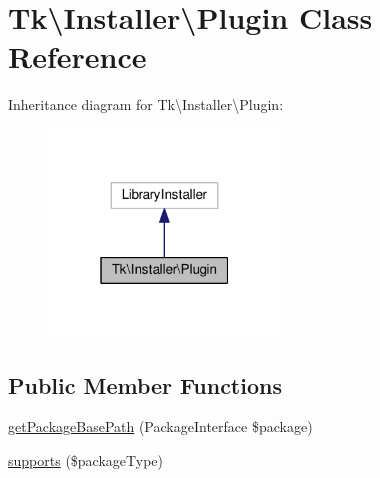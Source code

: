 \hypertarget{classTk_1_1Installer_1_1Plugin}{\section{Tk\textbackslash{}Installer\textbackslash{}Plugin Class Reference}
\label{classTk_1_1Installer_1_1Plugin}
}


Inheritance diagram for Tk\textbackslash{}Installer\textbackslash{}Plugin\+:\nopagebreak
\begin{figure}[H]
\begin{center}
\leavevmode
\includegraphics[width=175pt]{classTk_1_1Installer_1_1Plugin__inherit__graph}
\end{center}
\end{figure}
\subsection*{Public Member Functions}
\begin{DoxyCompactItemize}
\item 
\hyperlink{classTk_1_1Installer_1_1Plugin_a5df8ee916e06ed8aaede0d309ffa8e44}{get\+Package\+Base\+Path} (Package\+Interface \$package)
\item 
\hyperlink{classTk_1_1Installer_1_1Plugin_aca715b0b9feea611d62556c78190df7f}{supports} (\$package\+Type)
\end{DoxyCompactItemize}


